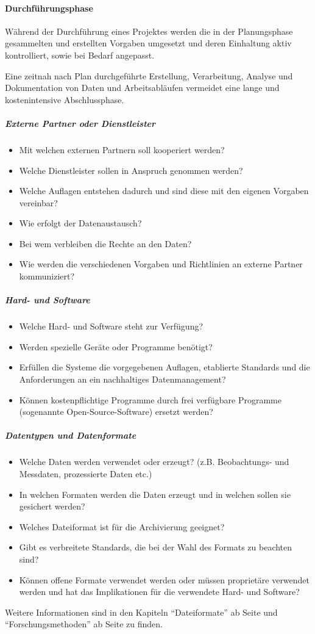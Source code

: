 \label{dmp-durchfuehrung}\paragraph{Durchführungsphase}
Während der Durchführung eines Projektes werden die in der Planungsphase gesammelten und erstellten Vorgaben umgesetzt und deren Einhaltung aktiv kontrolliert, sowie bei Bedarf angepasst. 

Eine zeitnah nach Plan durchgeführte Erstellung, Verarbeitung, Analyse und Dokumentation von Daten und Arbeitsabläufen vermeidet eine lange und kostenintensive Abschlussphase. 

\subparagraph{Externe Partner oder Dienstleister}
\begin{itemize}
    \item Mit welchen externen Partnern soll kooperiert werden?
    \item Welche Dienstleister sollen in Anspruch genommen werden?
    \item Welche Auflagen entstehen dadurch und sind diese mit den eigenen Vorgaben vereinbar?
    \item Wie erfolgt der Datenaustausch?
    \item Bei wem verbleiben die Rechte an den Daten?
    \item Wie werden die verschiedenen Vorgaben und Richtlinien an externe Partner kommuniziert?
\end{itemize}

\subparagraph{Hard- und Software}
\begin{itemize}
    \item Welche Hard- und Software steht zur Verfügung?
    \item Werden spezielle Geräte oder Programme benötigt?
    \item Erfüllen die Systeme die vorgegebenen Auflagen, etablierte Standards und die Anforderungen an ein nachhaltiges Datenmanagement?
    \item Können kostenpflichtige Programme durch frei verfügbare Programme (sogenannte Open-Source-Software) ersetzt werden?
\end{itemize}

\subparagraph{Datentypen und Datenformate}
\begin{itemize}
    \item Welche Daten werden verwendet oder erzeugt? (z.B. Beobachtungs- und Messdaten, prozessierte Daten etc.)
    \item In welchen Formaten werden die Daten erzeugt und in welchen sollen sie gesichert werden?
    \item Welches Dateiformat ist für die Archivierung geeignet?
    \item Gibt es verbreitete Standards, die bei der Wahl des Formats zu beachten sind?
    \item Können offene Formate verwendet werden oder müssen proprietäre verwendet werden und hat das Implikationen für die verwendete Hard- und Software?
\end{itemize}
Weitere Informationen sind in den Kapiteln "`Dateiformate"' ab Seite \pageref{dateiformate} und "`Forschungsmethoden"' ab Seite \pageref{methoden} zu finden.

